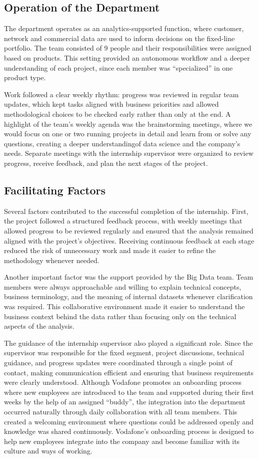 \documentclass[12pt, a4paper, oneside]{report}
\begin{document}
\subsection{Operation of the Department}
The department operates as an analytics-supported function, where customer, network and commercial data are used to inform decisions on the fixed-line portfolio. The team consisted of 9 people and their responsibilities were assigned based on products.  This setting provided an autonomous workflow and a deeper understanding of each project, since each member was “specialized” in one product type. 

Work followed a clear weekly rhythm: progress was reviewed in regular team updates, which kept tasks aligned with business priorities and allowed methodological choices to be checked early rather than only at the end. A highlight of the team’s weekly agenda was the brainstorming meetings, where we would focus on one or two running projects in detail and learn from   or solve any questions, creating  a deeper understandingof data science and the company’s needs. Separate meetings with the internship supervisor were organized to review progress, receive feedback, and plan the next stages of the project.

\subsection{Facilitating Factors}
Several factors contributed to the successful completion of the internship. First, the project followed a structured feedback process, with weekly meetings that allowed progress to be reviewed regularly and ensured that the analysis remained aligned with the project's objectives. Receiving continuous feedback at each stage reduced the risk of unnecessary work and made it easier to refine the methodology whenever needed.

Another important factor was the support provided by the Big Data team. Team members were always approachable and willing to explain technical concepts, business terminology, and the meaning of internal datasets whenever clarification was required. This collaborative environment made it easier to understand the business context behind the data rather than focusing only on the technical aspects of the analysis.

The guidance of the internship supervisor also played a significant role. Since the supervisor was responsible for the fixed segment, project discussions, technical guidance, and progress updates were coordinated through a single point of contact, making communication efficient and ensuring that business requirements were clearly understood. Although Vodafone promotes an onboarding process where new employees are introduced to the team and supported during their first weeks by the help of an assigned “buddy”, the integration into the department occurred naturally through daily collaboration with all team members. This created a welcoming environment where questions could be addressed openly and knowledge was shared continuously. Vodafone's onboarding process is designed to help new employees integrate into the company and become familiar with its culture and ways of working.
\end{document}

